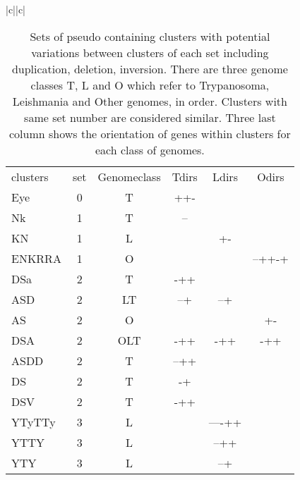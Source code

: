 \documentclass[table,
12pt, %
a4paper, %
oneside, %
headinclude,footinclude, %
BCOR5mm, %
]{scrartcl}
\begin{document}
\begin{table}[htbp]
  \caption{Sets of pseudo containing clusters with potential variations between clusters of each set including duplication, deletion, inversion. There are three genome classes T, L and O which refer to Trypanosoma, Leishmania and Other genomes, in order. Clusters with same set number are considered similar. Three last column shows the orientation of genes within clusters for each class of genomes.}
  \begin{adjustbox}{width=\textwidth,center}
    \begin{tabular}{|c||c|} \hline
      \begin{tabular}{l ccccc}
        clusters  & set & Genomeclass & Tdirs           & Ldirs  & Odirs  \\
        \rowcolor{shadecolor}
        Eye       & 0   & T           & ++-             &        &        \\
        Nk        & 1   & T           & --              &        &        \\
        \rowcolor{white}
        KN        & 1   & L           &                 & +-     &        \\
        ENKRRA    & 1   & O           &                 &        & --++-+ \\
        \rowcolor{shadecolor}
        DSa       & 2   & T           & -++             &        &        \\
        \rowcolor{white}
        ASD       & 2   & LT          & --+             & --+    &        \\
        AS        & 2   & O           &                 &        & +-     \\
        DSA       & 2   & OLT         & -++             & -++    & -++    \\
        ASDD      & 2   & T           & --++            &        &        \\
        DS        & 2   & T           & -+              &        &        \\
        DSV       & 2   & T           & -++             &        &        \\
        \rowcolor{shadecolor}
        YTyTTy    & 3   & L           &                 & ----++ &        \\
        \rowcolor{white}
        YTTY      & 3   & L           &                 & --++   &        \\
        YTY       & 3   & L           &                 & --+    &        \\

\end{tabular}
\end{tabular}
\end{adjustbox}
\end{table}
\end{document}
